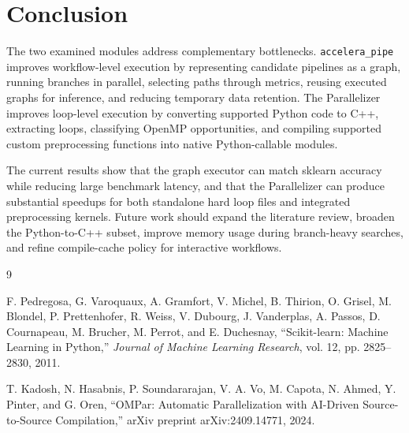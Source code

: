 \documentclass[12pt,a4paper,oneside]{report}
\begin{document}
\chapter{Conclusion}
\label{chap:conclusion}
The two examined modules address complementary bottlenecks. \texttt{accelera\_pipe} improves workflow-level execution by representing candidate pipelines as a graph, running branches in parallel, selecting paths through metrics, reusing executed graphs for inference, and reducing temporary data retention. The Parallelizer improves loop-level execution by converting supported Python code to C++, extracting loops, classifying OpenMP opportunities, and compiling supported custom preprocessing functions into native Python-callable modules.

The current results show that the graph executor can match sklearn accuracy while reducing large benchmark latency, and that the Parallelizer can produce substantial speedups for both standalone hard loop files and integrated preprocessing kernels. Future work should expand the literature review, broaden the Python-to-C++ subset, improve memory usage during branch-heavy searches, and refine compile-cache policy for interactive workflows.

\begin{thebibliography}{9}

F. Pedregosa, G. Varoquaux, A. Gramfort, V. Michel, B. Thirion,
O. Grisel, M. Blondel, P. Prettenhofer, R. Weiss, V. Dubourg,
J. Vanderplas, A. Passos, D. Cournapeau, M. Brucher, M. Perrot,
and E. Duchesnay,
``Scikit-learn: Machine Learning in Python,''
\textit{Journal of Machine Learning Research}, vol. 12, pp. 2825--2830, 2011.

T. Kadosh, N. Hasabnis, P. Soundararajan, V. A. Vo, M. Capota,
N. Ahmed, Y. Pinter, and G. Oren,
``OMPar: Automatic Parallelization with AI-Driven Source-to-Source Compilation,''
arXiv preprint arXiv:2409.14771, 2024.

\end{thebibliography}
\end{document}
